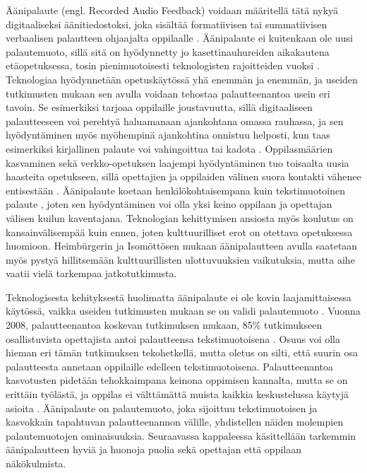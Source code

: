\documentclass[utf8]{gradu3}
\begin{document}
Äänipalaute (engl. Recorded Audio Feedback) voidaan määritellä tätä nykyä digitaaliseksi äänitiedostoksi, joka sisältää formatiivisen tai summatiivisen verbaalisen palautteen ohjaajalta oppilaalle \parencite{developing}. Äänipalaute ei kuitenkaan ole uusi palautemuoto, sillä sitä on hyödynnetty jo kasettinauhureiden aikakautena etäopetuksessa, tosin pienimuotoisesti teknologisten rajoitteiden vuoksi \parencite{developing}. Teknologiaa hyödynnetään opetuskäytössä yhä enemmän ja enemmän, ja useiden tutkimusten mukaan sen avulla voidaan tehostaa palautteenantoa usein eri tavoin. Se esimerkiksi tarjoaa oppilaille joustavuutta, sillä digitaaliseen palautteeseen voi perehtyä haluamanaan ajankohtana omassa rauhassa, ja sen hyödyntäminen myös myöhempinä ajankohtina onnistuu helposti, kun taas esimerkiksi kirjallinen palaute voi vahingoittua tai kadota \parencite{technology}. Oppilasmäärien kasvaminen sekä verkko-opetuksen laajempi hyödyntäminen tuo toisaalta uusia haasteita opetukseen, sillä opettajien ja oppilaiden välinen suora kontakti vähenee entisestään \parencite{engaging}. Äänipalaute koetaan henkilökohtaisempana kuin tekstimuotoinen palaute \parencite{evaluating}, joten sen hyödyntäminen voi olla yksi keino oppilaan ja opettajan välisen kuilun kaventajana. Teknologian kehittymisen ansiosta myös koulutus on kansainvälisempää kuin ennen, joten kulttuurilliset erot on otettava opetuksessa huomioon. Heimbürgerin ja Isomöttösen \parencite*{moderating} mukaan äänipalautteen avulla saatetaan myös pystyä hillitsemään kulttuurillisten ulottuvuuksien vaikutuksia, mutta aihe vaatii vielä tarkempaa jatkotutkimusta.

Teknologisesta kehityksestä huolimatta äänipalaute ei ole kovin laajamittaisessa käytössä, vaikka useiden tutkimusten mukaan se on validi palautemuoto \parencite{engaging}. Vuonna 2008, palautteenantoa koskevan tutkimuksen mukaan, 85\% tutkimukseen osallistuvista opettajista antoi palautteensa tekstimuotoisena \parencite{electronic}. Osuus voi olla hieman eri tämän tutkimuksen tekohetkellä, mutta oletus on silti, että suurin osa palautteesta annetaan oppilaille edelleen tekstimuotoisena. Palautteenantoa kasvotusten pidetään tehokkaimpana keinona oppimisen kannalta, mutta se on erittäin työlästä, ja oppilas ei välttämättä muista kaikkia keskustelussa käytyjä asioita \parencite{modes}. Äänipalaute on palautemuoto, joka sijoittuu tekstimuotoisen ja kasvokkain tapahtuvan palautteenannon välille, yhdistellen näiden molempien palautemuotojen ominaisuuksia. Seuraavassa kappaleessa käsittellään tarkemmin äänipalautteen hyviä ja huonoja puolia sekä opettajan että oppilaan näkökulmista.
\end{document}
